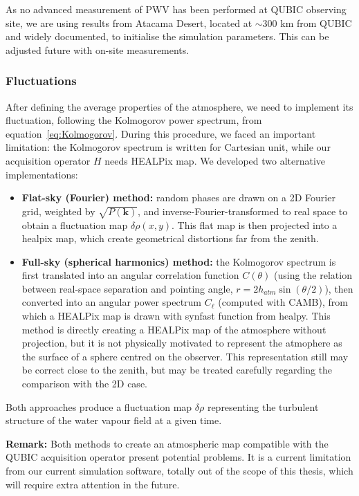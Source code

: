 \documentclass[../../thesis.tex]{subfiles}
\begin{document}
As no advanced measurement of PWV has been performed at QUBIC observing site, we are using results from Atacama Desert, located at $\sim 300$ km from QUBIC and widely documented, to initialise the simulation parameters. This can be adjusted future with on-site measurements.

\subsubsection{Fluctuations}

After defining the average properties of the atmosphere, we need to implement its fluctuation, following the Kolmogorov power spectrum, from equation~\ref{eq:Kolmogorov}. During this procedure, we faced an important limitation: the Kolmogorov spectrum is written for Cartesian unit, while our acquisition operator $H$ needs HEALPix map. We developed two alternative implementations:

\begin{itemize}
    \item \textbf{Flat-sky (Fourier) method: }random phases are drawn on a 2D Fourier grid, weighted by $\sqrt{P(\mathbf{k})}$, and inverse-Fourier-transformed to real space to obtain a fluctuation map $\delta\rho(x,y)$. This flat map is then projected into a healpix map, which create geometrical distortions far from the zenith. 
    \item \textbf{Full-sky (spherical harmonics) method: }the Kolmogorov spectrum is first translated into an angular correlation function $C(\theta)$ (using the relation between real-space separation and pointing angle, $r = 2h_{atm}\sin(\theta/2)$), then converted into an angular power spectrum $C_\ell$ (computed with CAMB), from which a HEALPix map is drawn with synfast function from healpy. This method is directly creating a HEALPix map of the atmosphere without projection, but it is not physically motivated to represent the atmophere as the surface of a sphere centred on the observer. This representation still may be correct close to the zenith, but may be treated carefully regarding the comparison with the 2D case.
\end{itemize}

Both approaches produce a fluctuation map $\delta\rho$ representing the turbulent structure of the water vapour field at a given time.

\textbf{Remark: }Both methods to create an atmospheric map compatible with the QUBIC acquisition operator present potential problems. It is a current limitation from our current simulation software, totally out of the scope of this thesis, which will require extra attention in the future.
\end{document}
